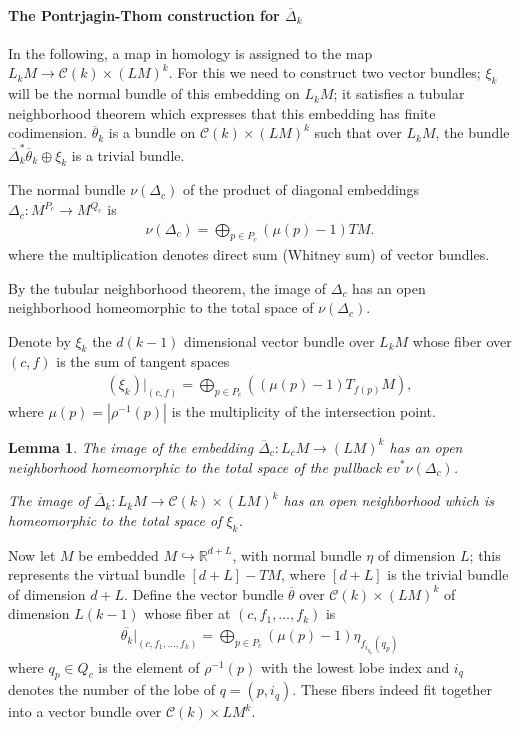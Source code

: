 \documentclass{scrartcl}
\theoremstyle{plain}
\newtheorem{lemma}[theorem]{Lemma}
\theoremstyle{definition}
\newcommand{\R}{\mathbb{R}}
\newcommand{\abs}[1]{\left\lvert#1\right\rvert}
\begin{document}
\paragraph{The Pontrjagin-Thom construction for $\overline{\Delta}_k$} In the following, a map in homology is assigned to the map $L_k M \to \mathcal C(k) \times {(LM)}^k$. For this we need to construct two vector bundles; $\xi_k$ will be the normal bundle of this embedding on $L_kM$; it satisfies a tubular neighborhood theorem which expresses that this embedding has finite codimension. $\overline\theta_k$ is a bundle on $\mathcal C(k) \times {(LM)}^k$ such that over $L_kM$, the bundle $\overline\Delta_k^*\overline \theta_k \oplus\xi_k$ is a trivial bundle. 

The normal bundle $\nu(\Delta_c)$ of the product of diagonal embeddings $\Delta_c \colon M^{P_c}\to M^{Q_c}$ is 
\begin{align*}
    \nu(\Delta_c) = \bigoplus_{p\in P_c} (\mu(p)-1) TM.
\end{align*}
where the multiplication denotes direct sum (Whitney sum) of vector bundles. 

By the tubular neighborhood theorem, the image of $\Delta_c$ has an open neighborhood homeomorphic to the total space of $\nu(\Delta_c)$. 

Denote by $\xi_k$ the $d(k-1)$ dimensional vector bundle over $L_kM$ whose fiber over $(c,f)$ is the sum of tangent spaces 
\begin{align*}
    (\xi_k)|_{(c, f)} = \bigoplus_{p\in P_c} ((\mu(p)-1) T_{f(p)}M), 
\end{align*}
where $\mu(p) = \abs{\rho^{-1}(p)}$ is the multiplicity of the intersection point. 

\begin{lemma}
    The image of the embedding $\overline\Delta_c\colon L_cM\to(LM)^k$ has an open neighborhood homeomorphic to the total space of the pullback $ev^*\nu(\Delta_c)$. 

    The image of $\overline\Delta_k\colon L_kM\to\mathcal C(k)\times (LM)^k$ has an open neighborhood which is homeomorphic to the total space of $\xi_k$. 
\end{lemma}

Now let $M$ be embedded $M\hookrightarrow \R^{d+L}$, with normal bundle $\eta$ of dimension $L$; this represents the virtual bundle $[d+L]-TM$, where $[d+L]$ is the trivial bundle of dimension $d+L$. Define the vector bundle $\overline\theta$ over $\mathcal C(k) \times (LM)^k$ of dimension $L(k-1)$ whose fiber at $(c, f_1, \dots, f_k)$ is 
\begin{align*}
    \overline{\theta_k}|_{(c, f_1, \dots, f_k)} = \bigoplus_{p\in P_c} (\mu(p)-1)\eta_{f_{i_{q_p}}(q_{p})} 
\end{align*}
where $q_p\in Q_c$ is the element of $\rho^{-1}(p)$ with the lowest lobe index and $i_q$ denotes the number of the lobe of $q = (p, i_q)$. These fibers indeed fit together into a vector bundle over $\mathcal C(k)\times LM^k$. 
\end{document}
